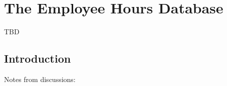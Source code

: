 
\chapter{The Employee Hours Database}

\label{cehd0}

                  {TBD}


\section{Introduction}
\label{cehd0:sint0}

Notes from discussions:

